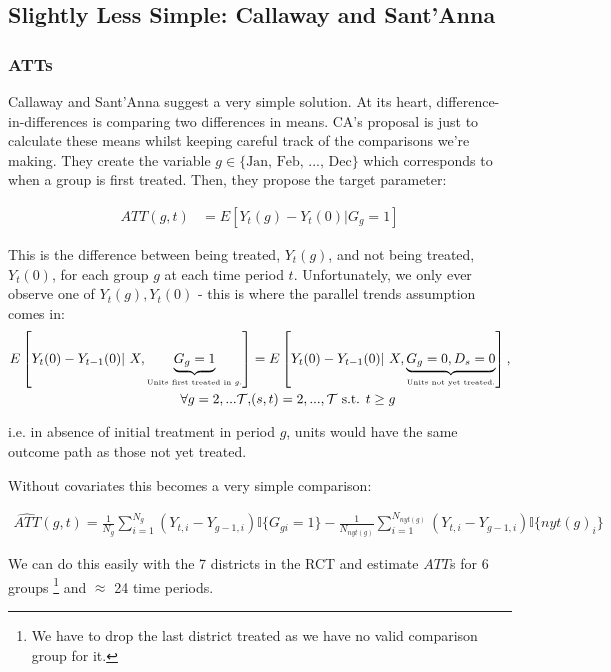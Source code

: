 \documentclass{article}
\begin{document}
\subsection*{Slightly Less Simple: Callaway and Sant'Anna}
\subsubsection*{ATTs}
Callaway and Sant'Anna suggest a very simple solution. At its heart, difference-in-differences
is comparing two differences in means. CA's proposal is just to calculate these means
whilst keeping careful track of the comparisons we're making. They create the 
variable $g \in \{ \text{Jan, Feb, ..., Dec}\}$ which corresponds to when a group 
is first treated. Then, they propose the target parameter:


\begin{align*}
   ATT(g,t) &= E\left[ 
      Y_t(g) - Y_t(0) | G_g = 1
   \right]
\end{align*}

This is the difference between being treated, $Y_t(g)$, and 
not being treated, $Y_t(0)$, for each group $g$ at each time period $t$. Unfortunately, 
we only ever observe one of $Y_t(g), Y_t(0)$ - this is where the parallel trends 
assumption comes in:
\begin{align*}
   E\left[Y_t(0) - Y_{t-1}(0) |\  X, \underbrace{G_g = 1}_{\text{{\tiny Units first treated in $g$.}}}\right] &= 
   E\left[
      Y_t(0) - Y_{t-1}(0) |\  X, \underbrace{G_g  = 0 , D_s = 0}_\text{{\tiny Units not yet treated.}} 
   \right],  \\ \forall g = 2, ... \mathcal{T}, & (s,t) = 2, ..., \mathcal{T} \text{ s.t. } t \geq g
\end{align*}

    i.e. in absence of initial treatment in period $g$, units would 
    have the same outcome path as those not yet treated. 

   Without covariates this becomes a very simple comparison:

   \begin{align*}
      \hat{ATT}(g,t) = \frac{1}{N_g} \sum_{i=1}^{N_g}  (Y_{t,i} - Y_{g-1,i}) \mathbb{I}\{G_{gi} = 1\} -
      \frac{1}{N_{nyt(g)}} \sum_{i=1}^{N_{nyt(g)}} (Y_{t,i} - Y_{g-1,i})\mathbb{I}\{nyt(g)_i\} 
   \end{align*}


   We can do this easily with the 7 districts in the RCT and estimate $ATT$s for 
   6 groups \footnote{We have to drop the last district treated as we have no valid comparison 
   group for it.} and $\approx$ 24 time periods.
   
\end{document}
